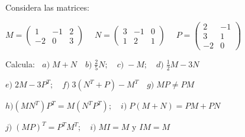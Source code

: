 \begin{ejre}
Considera las matrices:  

$ M=\left( \begin{matrix} 1&-1&2\\-2&0&3  \end{matrix} \right)\; \quad  N=\left( \begin{matrix} 3&-1&0\\1&2&1  \end{matrix} \right)\; \quad  P=\left( \begin{matrix}  2&-1\\3&1\\-2&0 \end{matrix} \right)$

\noindent Calcula: 
$\; \; a) \; M+N \quad b)\; \frac 2 5 N; \quad c)\; -M; \quad d)\; \frac 1 2 M - 3 N$
 
 $e)\; 2M-3P^T; \quad f)\; 3(N^T+P)-M^T\quad g)\; MP \neq PM$

 $ h) (MN^T)P^T=M(N^TP^T); \quad i) \; P(M+N)=PM+PN$

 $j)\; (MP)^T=P^TM^T; \quad i)\; MI=M \text { y } IM=M $
\end{ejre}
